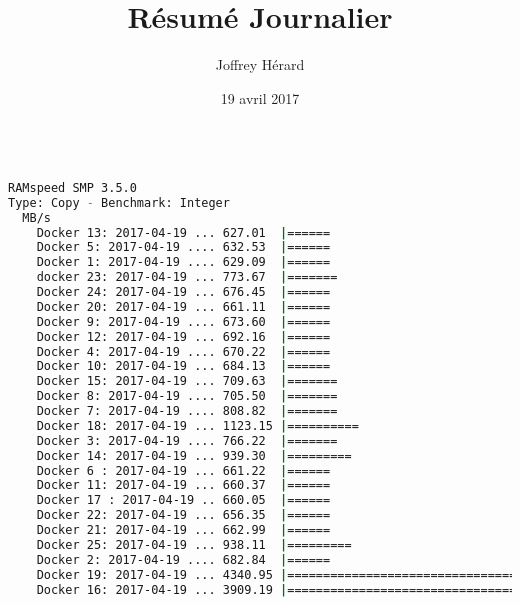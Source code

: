 \documentclass[french]{article}
\begin{document}
\title{Résumé Journalier}
\author{Joffrey Hérard}
\date{19 avril 2017} 

\maketitle

\begin{lstlisting}[language=bash,caption={}]

RAMspeed SMP 3.5.0
Type: Copy - Benchmark: Integer
  MB/s
    Docker 13: 2017-04-19 ... 627.01  |======
    Docker 5: 2017-04-19 .... 632.53  |======
    Docker 1: 2017-04-19 .... 629.09  |======
    docker 23: 2017-04-19 ... 773.67  |=======
    Docker 24: 2017-04-19 ... 676.45  |======
    Docker 20: 2017-04-19 ... 661.11  |======
    Docker 9: 2017-04-19 .... 673.60  |======
    Docker 12: 2017-04-19 ... 692.16  |======
    Docker 4: 2017-04-19 .... 670.22  |======
    Docker 10: 2017-04-19 ... 684.13  |======
    Docker 15: 2017-04-19 ... 709.63  |=======
    Docker 8: 2017-04-19 .... 705.50  |=======
    Docker 7: 2017-04-19 .... 808.82  |=======
    Docker 18: 2017-04-19 ... 1123.15 |==========
    Docker 3: 2017-04-19 .... 766.22  |=======
    Docker 14: 2017-04-19 ... 939.30  |=========
    Docker 6 : 2017-04-19 ... 661.22  |======
    Docker 11: 2017-04-19 ... 660.37  |======
    Docker 17 : 2017-04-19 .. 660.05  |======
    Docker 22: 2017-04-19 ... 656.35  |======
    Docker 21: 2017-04-19 ... 662.99  |======
    Docker 25: 2017-04-19 ... 938.11  |=========
    Docker 2: 2017-04-19 .... 682.84  |======
    Docker 19: 2017-04-19 ... 4340.95 |========================================
    Docker 16: 2017-04-19 ... 3909.19 |====================================


\end{lstlisting}
\end{document}
